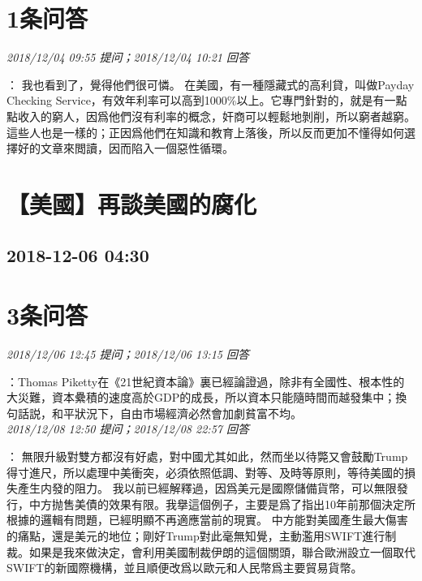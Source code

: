 \documentclass[twocolumn]{ctexart}
\begin{document}
\section{1条问答}

\textit{\hfill\noindent\small 2018/12/04 09:55 提问；2018/12/04 10:21 回答}

：
我也看到了，覺得他們很可憐。
在美國，有一種隱藏式的高利貸，叫做Payday Checking Service，有效年利率可以高到1000\%以上。它專門針對的，就是有一點點收入的窮人，因爲他們沒有利率的概念，奸商可以輕鬆地剝削，所以窮者越窮。
這些人也是一樣的；正因爲他們在知識和教育上落後，所以反而更加不懂得如何選擇好的文章來閲讀，因而陷入一個惡性循環。
\\


\section{【美國】再談美國的腐化}
\subsection{2018-12-06 04:30}


\section{3条问答}

\textit{\hfill\noindent\small 2018/12/06 12:45 提问；2018/12/06 13:15 回答}

：Thomas Piketty在《21世紀資本論》裏已經論證過，除非有全國性、根本性的大災難，資本纍積的速度高於GDP的成長，所以資本只能隨時間而越發集中；換句話説，和平狀況下，自由市場經濟必然會加劇貧富不均。
\\

\textit{\hfill\noindent\small 2018/12/08 12:50 提问；2018/12/08 22:57 回答}

：
無限升級對雙方都沒有好處，對中國尤其如此，然而坐以待斃又會鼓勵Trump得寸進尺，所以處理中美衝突，必須依照低調、對等、及時等原則，等待美國的損失產生内發的阻力。
我以前已經解釋過，因爲美元是國際儲備貨幣，可以無限發行，中方抛售美債的效果有限。我擧這個例子，主要是爲了指出10年前那個決定所根據的邏輯有問題，已經明顯不再適應當前的現實。
中方能對美國產生最大傷害的痛點，還是美元的地位；剛好Trump對此毫無知覺，主動濫用SWIFT進行制裁。如果是我來做決定，會利用美國制裁伊朗的這個關頭，聯合歐洲設立一個取代SWIFT的新國際機構，並且順便改爲以歐元和人民幣爲主要貿易貨幣。
\\
\end{document}
